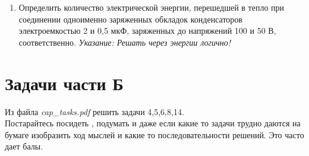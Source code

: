 \documentclass[a4paper,12pt]{article} %
\begin{document}
\begin{enumerate}
	\item Определить количество электрической энергии, перешедшей в тепло при соединении одноименно заряженных обкладок конденсаторов электроемкостью 2 и 0,5 мкФ, заряженных до напряжений 100 и 50 В, соответственно.
	\textit{Указание: Решать через энергии логично!}

\end{enumerate}


\section{Задачи части Б}

Из файла \textit{cap\_tasks.pdf} решить задачи 4,5,6,8,14. \\

Постарайтесь посидеть ,  подумать и даже если какие то задачи трудно даются на бумаге изобразить ход мыслей и какие то последовательности решений. Это часто дает балы.
\end{document}
